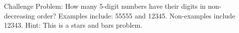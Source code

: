 \documentclass[addpoints,12pt]{exam}
\begin{document}
\begin{questions}
\addpoints

\question[2] Challenge Problem: How many 5-digit numbers have their digits in non-decreasing order? Examples include: 55555 and 12345. Non-examples include 12343. Hint: This is a stars and bars problem.

\end{questions}
\end{document}
